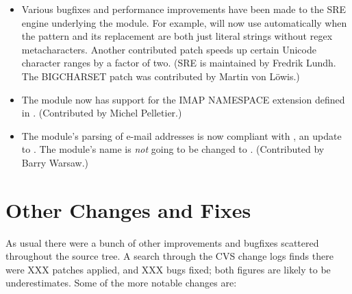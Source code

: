 \documentclass{howto}
\begin{document}
\begin{itemize}
  \item Various bugfixes and performance improvements have been made
  to the SRE engine underlying the  module.  For example,
   will now use 
  automatically when the pattern and its replacement are both just
  literal strings without regex metacharacters.  Another contributed
  patch speeds up certain Unicode character ranges by a factor of
  two. (SRE is maintained by Fredrik Lundh.  The BIGCHARSET patch was
  contributed by Martin von L\"owis.)

  \item The  module now has support for the IMAP
  NAMESPACE extension defined in .  (Contributed by Michel
  Pelletier.)

  \item The  module's parsing of e-mail addresses is
  now compliant with , an update to .  The module's
  name is \emph{not} going to be changed to .
  (Contributed by Barry Warsaw.)
  
\end{itemize}


\section{Other Changes and Fixes}

As usual there were a bunch of other improvements and bugfixes
scattered throughout the source tree.  A search through the CVS change
logs finds there were XXX patches applied, and XXX bugs fixed; both
figures are likely to be underestimates.  Some of the more notable
changes are:
\end{document}
